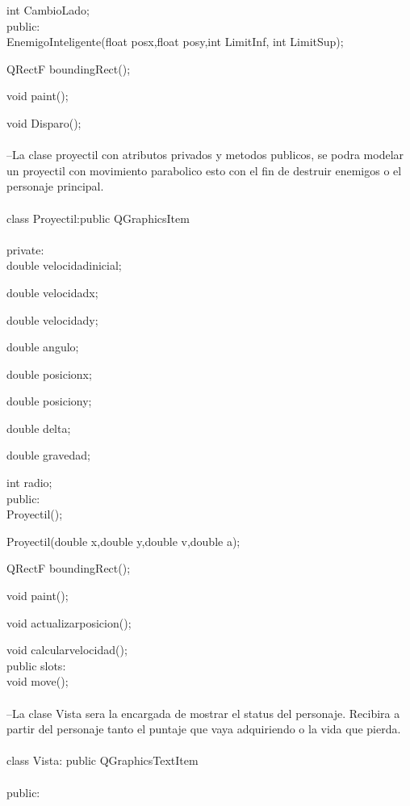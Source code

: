 \documentclass{article}
\begin{document}
    int CambioLado;\\
public:\\

    EnemigoInteligente(float posx,float posy,int LimitInf, int LimitSup);

    QRectF boundingRect();
    
    void paint();
    
    void Disparo();\\

\rbrace\\

--La clase proyectil con atributos privados y metodos publicos, se podra modelar un proyectil con movimiento parabolico esto con el fin de destruir enemigos o el personaje principal.\\
\\
class Proyectil:public QGraphicsItem\\
\lbrace\\
private:\\

    double velocidadinicial;
    
    double velocidadx;
    
    double velocidady;
    
    double angulo;
    
    double posicionx;
    
    double posiciony;

    double delta;
    
    double gravedad;

    int radio;\\
public:\\

    Proyectil();
    
    Proyectil(double x,double y,double v,double a);

    QRectF boundingRect();
    
    void paint();

    void actualizarposicion();
    
    void calcularvelocidad();\\
public slots:\\

    void move();\\
\rbrace\\

--La clase Vista sera la encargada de mostrar el status del personaje. Recibira a partir del personaje tanto el puntaje que vaya adquiriendo o la vida que pierda.\\
\\
class Vista: public QGraphicsTextItem\\
\lbrace\\
public:\\
\end{document}
